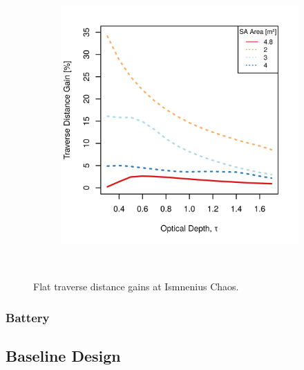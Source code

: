 \begin{figure}[h]
\begin{subfigure}[t]{\subfigureWidth}
        \includegraphics[height=\graphicsHeight]{sections/design/solar-array/plots/ismeniuscavus-75w-traverse-gains-for-different-sa-areas.png}
		\label{fig:plot:sub:ismenius-chaos-flat-traverse-gains-for-different-sa-area}
	\end{subfigure}\\[0.8ex]
    \caption[Flat traverse distance gains at Ismnenius Chaos]
            {Flat traverse distance gains at Ismnenius Chaos.}
    \label{fig:plot:ismenius-chaos-flat-traverse-gains}
\vspace{-2ex}
\end{figure}




\clearpage
\subsubsection{Battery}

\subsection{Baseline Design}

